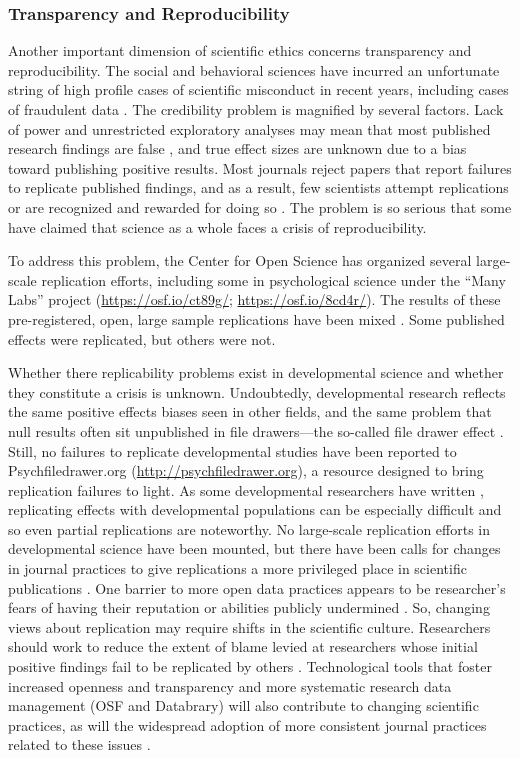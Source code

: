 \documentclass[letterpaper,man,apacite,natbib]{apa6}
\begin{document}
\subsubsection{Transparency and Reproducibility}
Another important dimension of scientific ethics concerns transparency and reproducibility.
The social and behavioral sciences have incurred an unfortunate string of high profile cases of scientific misconduct in recent years, including cases of fraudulent data \cite{singal_case_2015, bhattacharjee_diederik_2013}.
The credibility problem is magnified by several factors.
Lack of power and unrestricted exploratory analyses may mean that most published research findings are false \cite{ioannidis_why_2005}, and true effect sizes are unknown due to a bias toward publishing positive results.
Most journals reject papers that report failures to replicate published findings, and as a result, few scientists attempt replications or are recognized and rewarded for doing so \cite{nosek_scientific_2012}.
The problem is so serious that some have claimed that science as a whole faces a crisis of reproducibility.

To address this problem, the Center for Open Science has organized several large-scale replication efforts, including some in psychological science under the ``Many Labs'' project (\url{https://osf.io/ct89g/}; \url{https://osf.io/8cd4r/}).
The results of these pre-registered, open, large sample replications have been mixed \cite{collaboration_estimating_2015}.
Some published effects were replicated, but others were not.

Whether there replicability problems exist in developmental science and whether they constitute a crisis is unknown.
Undoubtedly, developmental research reflects the same positive effects biases seen in other fields, and the same problem that null results often sit unpublished in file drawers---the so-called file drawer effect \cite{rosenthal_file_1979}.
Still, no failures to replicate developmental studies have been reported to Psychfiledrawer.org (\url{http://psychfiledrawer.org}), a resource designed to bring replication failures to light.
As some developmental researchers have written \cite{bishop-blog-2012}, replicating effects with developmental populations can be especially difficult and so even partial replications are noteworthy.
No large-scale replication efforts in developmental science have been mounted, but there have been calls for changes in journal practices to give replications a more privileged place in scientific publications \cite{bishop-blog-2012}.
One barrier to more open data practices appears to be researcher's fears of having their reputation or abilities publicly undermined \cite{ascoli_ups_2006}.
So, changing views about replication may require shifts in the scientific culture.
Researchers should work to reduce the extent of blame levied at researchers whose initial positive findings fail to be replicated by others \cite{bishop-blog-2015}.
Technological tools that foster increased openness and transparency and more systematic research data management (OSF and Databrary) will also contribute to changing scientific practices, as will the widespread adoption of more consistent journal practices related to these issues \cite{nosek_promoting_2015}.
\end{document}
